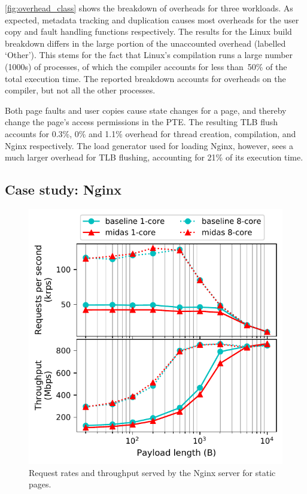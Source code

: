 \documentclass[letterpaper,twocolumn,10pt]{article}
\begin{document}
\autoref{fig:overhead_class} shows the breakdown of overheads for three
workloads.
As expected, metadata tracking and duplication causes most overheads
for the user copy and fault handling functions respectively.
The results for the Linux build breakdown differs in the large portion of
the unaccounted overhead (labelled `Other').
This stems for the fact that Linux's compilation runs a large number (1000s)
of processes, of which the compiler accounts for less than~50\% of the
total execution time.
The reported breakdown accounts for overheads on the compiler, but not
all the other processes.

Both page faults and user copies cause state changes for a page, and thereby
change the page's access permissions in the PTE.
The resulting TLB flush accounts for 0.3\%, 0\% and 1.1\% overhead for
thread creation, compilation, and Nginx respectively.
The load generator  used for loading Nginx, however, sees
a much larger overhead for TLB flushing, accounting for
21\% of its execution time.

\subsection{Case study: Nginx}

\begin{figure}
  \centering
  \includegraphics[width=\linewidth]{img/nginx_performance.pdf}
  \caption{Request rates and throughput served by the Nginx server for
          static pages.}
  \label{fig:nginx_perf}
\end{figure}
\end{document}
